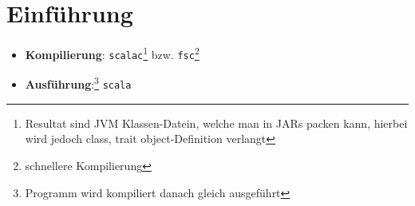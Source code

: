 \newcommand{\home}{../../latex/styles} %





\newcommand{\pdfauthor}{Matthias Günther}
\newcommand{\pdftitle}{git}
\newcommand{\pdfsubject}{Aufzeichnungen zur Fortbildung}
\newcommand{\pdfkeywords}{git, svn, SCM, SVN}
\newcommand{\motto}{Scala - just scale your large applications}
\newcommand{\tutor}{}
\newcommand{\disclaimer}{(Die Autoren übernehmen keine Garantie und Haftung 
für die Korrektheit des Skriptes. Das Skript ist unter den Namen von Matthias 
Günther veröffentlich.)}
\newcommand{\publisher}{Der Helex-Matze Verlag $\sum\limits_{i=1}^{n}i$}
\newcommand{\pdfemail}{matthias.guenther@wikimatze.de}
\newcommand{\correctiontext}{Kommentare/Korrekturen an}
\newcommand{\homepagetext}{Homepage}
\newcommand{\homepage}{wikimatze.de}
\newcommand{\coverdisclaimer}{Copyright Skript-Covers}
\newcommand{\covercopyright}{\textsc{Ubisoft} (\url{ubi.com})}
















\section{Einführung}
\begin{itemize}
  \item \textbf{Kompilierung}: \texttt{scalac}\footnote{Resultat sind JVM Klassen-Datein, welche man in JARs packen kann, hierbei wird jedoch class, trait \oder object-Definition verlangt} bzw. \texttt{fsc}\footnote{schnellere Kompilierung}
  \item \textbf{Ausführung}:\footnote{Programm wird kompiliert \und danach gleich ausgeführt} \texttt{scala}
\end{itemize}


